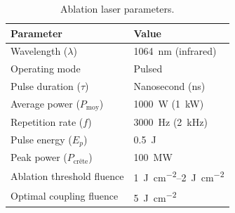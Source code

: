 \documentclass[11pt,a4paper]{article}
\begin{document}
\begin{enumerate}
    \begin{table}[H]
      \centering
      \small
      \caption{Ablation laser parameters.}
      \label{tab:laser_ablation}
      \begin{tabular}{p{6cm} p{6cm}}
        \toprule
        \textbf{Parameter} & \textbf{Value} \\
        \midrule
        Wavelength ($\lambda$) & \SI{1064}{\nano\metre} (infrared) \\
        Operating mode & Pulsed \\
        Pulse duration ($\tau$) & Nanosecond (ns) \\
        Average power ($P_{\text{moy}}$) & \SI{1000}{\watt} (\SI{1}{\kilo\watt}) \\
        Repetition rate ($f$) & \SI{3000}{\hertz} (\SI{2}{\kilo\hertz}) \\
        Pulse energy ($E_p$) & \SI{0.5}{\joule} \\
        Peak power ($P_{\text{crête}}$) & \SI{100}{\mega\watt} \\
        Ablation threshold fluence & \SIrange{1}{2}{\joule\per\centi\metre\squared} \\
        Optimal coupling fluence & \SI{5}{\joule\per\centi\metre\squared} \\
        \bottomrule
      \end{tabular}
    \end{table}
\end{enumerate}

\newpage
\end{document}

